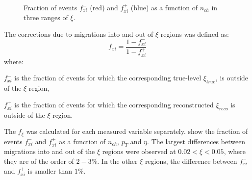 \begin{figure}[h!]
\begin{subfigure}{.49\textwidth}
	\end{subfigure}
	\begin{minipage}{.49\textwidth}
		\caption[Fraction of events $f_{xi}^-$ and $f_{xi}^+$ as a function of $n_{ch}$ in three ranges of $\xi$]{Fraction of events $f_{xi}^-$ (red) and $f_{xi}^+$ (blue) as a function of $n_{ch}$ in three ranges of $\xi$.}
		\label{fig:xi_correction_nch}
	\end{minipage}
	
\end{figure}

The corrections due to migrations into and out of  $\xi$ regions was defined as:
 \begin{equation}
 f_{xi} = \frac{1-f_{xi}^-}{1-f_{xi}^+}
 \end{equation}
 where:
 \begin{description}
 	\item $f_{xi}^-$ is the fraction of events for which the corresponding true-level $\xi_{true}$, is outside of the $\xi$ region,
 	\item $f_{xi}^+$  is the fraction of events for which the corresponding reconstructed $\xi_{reco}$ is outside of the $\xi$ region.
 \end{description}
 The $f_{\xi}$ was calculated for each measured variable separately.  show the fraction of events $f_{xi}^-$ and $f_{xi}^+$ as a function of $n_{ch}$, $p_T$ and $\bar{\eta}$. The largest differences between migrations into and out of the $\xi$ regions were observed at $0.02<\xi<0.05$, where they are of the order of $2-3\%$. In the other $\xi$ regions, the difference between $f_{xi}^-$ and $f_{xi}^+$  is smaller than $1\%$.
